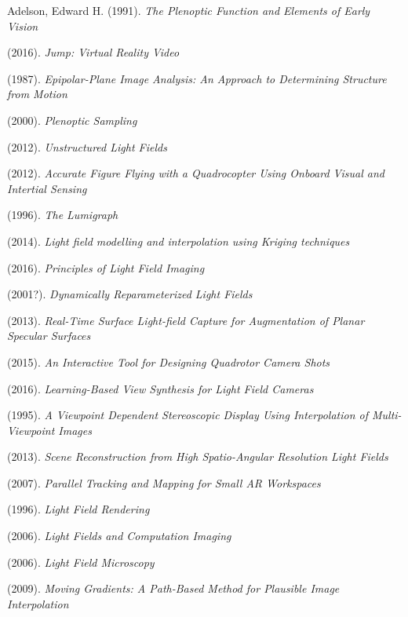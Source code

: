 \documentclass[12pt]{report}
\begin{document}
\begin{thebibliography}{10}%

	Adelson, Edward H. (1991). \emph{The Plenoptic Function and Elements of Early Vision}

	(2016). \emph{Jump: Virtual Reality Video}

	(1987). \emph{Epipolar-Plane Image Analysis: An Approach to Determining Structure from Motion}

	(2000). \emph{Plenoptic Sampling}

	(2012). \emph{Unstructured Light Fields}

	(2012). \emph{Accurate Figure Flying with a Quadrocopter Using Onboard Visual and Intertial Sensing}

	(1996). \emph{The Lumigraph}
	
	(2014). \emph{Light field modelling and interpolation using Kriging techniques}	
	
	(2016). \emph{Principles of Light Field Imaging}	
	
	(2001?). \emph{Dynamically Reparameterized Light Fields}

	(2013). \emph{Real-Time Surface Light-field Capture for Augmentation of Planar Specular Surfaces}
	
	(2015). \emph{An Interactive Tool for Designing Quadrotor Camera Shots}

	(2016). \emph{Learning-Based View Synthesis for Light Field Cameras}

	(1995). \emph{A Viewpoint Dependent Stereoscopic Display Using Interpolation of Multi-Viewpoint Images}
	
	(2013). \emph{Scene Reconstruction from High Spatio-Angular Resolution Light Fields}	
	
	(2007). \emph{Parallel Tracking and Mapping for Small AR Workspaces}	
	
	(1996). \emph{Light Field Rendering}
	
	(2006). \emph{Light Fields and Computation Imaging}

	(2006). \emph{Light Field Microscopy}
	
	(2009). \emph{Moving Gradients: A Path-Based Method for Plausible Image Interpolation}	
	

\end{thebibliography}
\end{document}
